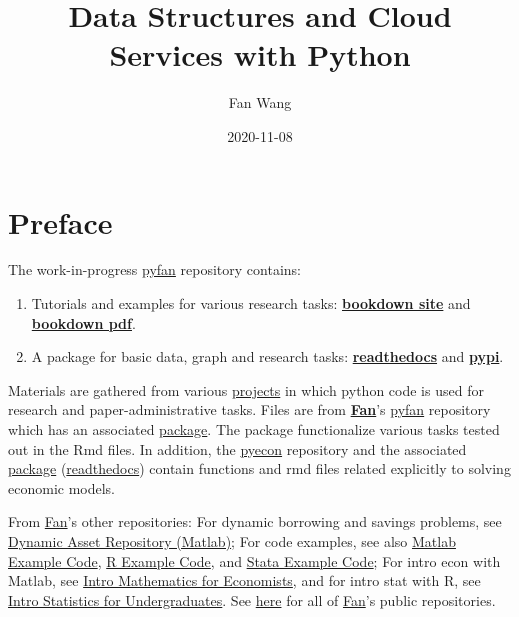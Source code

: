 \documentclass[
]{book}
\title{Data Structures and Cloud Services with Python}
\author{Fan Wang}
\date{2020-11-08}
\providecommand{\tightlist}{%
  \setlength{\itemsep}{0pt}\setlength{\parskip}{0pt}}
\begin{document}
\maketitle

{
\hypersetup{linkcolor=}
\setcounter{tocdepth}{2}
\tableofcontents
}
\hypertarget{preface}{%
\chapter*{Preface}\label{preface}}

The work-in-progress \href{https://github.com/FanWangEcon/pyfan}{pyfan} repository contains:

\begin{enumerate}
\def\labelenumi{\arabic{enumi}.}
\tightlist
\item
  Tutorials and examples for various research tasks: \href{https://fanwangecon.github.io/pyfan/bookdown}{\textbf{bookdown site}} and \href{https://fanwangecon.github.io/pyfan/bookdown/Data-Structures-and-Cloud-Services-with-Python.pdf}{\textbf{bookdown pdf}}.
\item
  A package for basic data, graph and research tasks: \href{https://pyfan.readthedocs.io/en/latest/}{\textbf{readthedocs}} and \href{https://pypi.org/project/pyfan/}{\textbf{pypi}}.
\end{enumerate}

Materials are gathered from various \href{https://fanwangecon.github.io/research}{projects} in which python code is used for research and paper-administrative tasks. Files are from \href{https://fanwangecon.github.io/}{\textbf{Fan}}'s \href{https://github.com/FanWangEcon/pyfan}{pyfan} repository which has an associated \href{https://pypi.org/project/pyfan/}{package}. The package functionalize various tasks tested out in the Rmd files. In addition, the \href{https://github.com/FanWangEcon/pyecon}{pyecon} repository and the associated \href{https://pypi.org/project/pyecon/}{package} (\href{https://pyfan.readthedocs.io/en/latest/autoapi/pyfan/index.html\#module-pyfan}{readthedocs}) contain functions and rmd files related explicitly to solving economic models.

From \href{https://fanwangecon.github.io/}{Fan}'s other repositories: For dynamic borrowing and savings problems, see \href{https://fanwangecon.github.io/CodeDynaAsset/}{Dynamic Asset Repository (Matlab)}; For code examples, see also \href{https://fanwangecon.github.io/M4Econ/}{Matlab Example Code}, \href{https://fanwangecon.github.io/R4Econ/}{R Example Code}, and \href{https://fanwangecon.github.io/Stata4Econ/}{Stata Example Code}; For intro econ with Matlab, see \href{https://fanwangecon.github.io/Math4Econ/}{Intro Mathematics for Economists}, and for intro stat with R, see \href{https://fanwangecon.github.io/Stat4Econ/}{Intro Statistics for Undergraduates}. See \href{https://github.com/FanWangEcon}{here} for all of \href{https://fanwangecon.github.io/}{Fan}'s public repositories.
\end{document}
